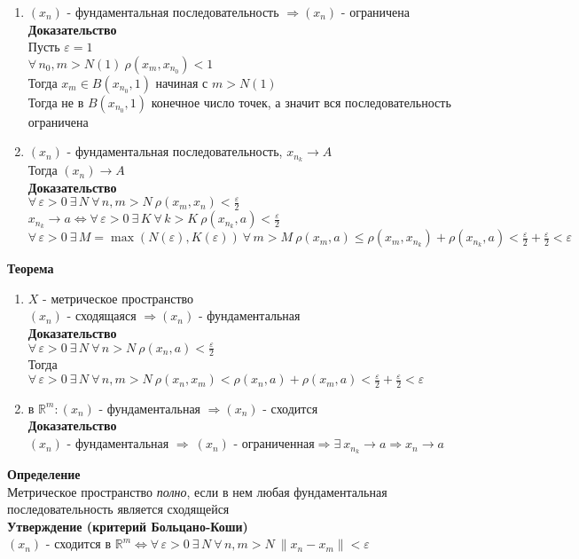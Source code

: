 \documentclass[12pt]{article}
\begin{document}
\begin{enumerate}
    \item $(x_n)$ - фундаментальная последовательность $\Rightarrow (x_n)$ - ограничена\\
    \textbf{Доказательство}\\
    Пусть $\varepsilon = 1$\\
    $\forall\,n_0,m > N(1)\ \rho(x_m,x_{n_0}) < 1$\\
    Тогда $x_m \in B(x_{n_0},1)$ начиная с $m > N(1)$\\
    Тогда не в $B(x_{n_0},1)$ конечное число точек, а значит вся последовательность ограничена
    \item $(x_n)$ - фундаментальная последовательность, $x_{n_k} \rightarrow A$\\
    Тогда $(x_n) \rightarrow A$\\
    \textbf{Доказательство}\\
    $\forall\,\varepsilon>0\ \exists\,N\ \forall\,n,m>N\ \rho(x_m,x_n) < \frac\varepsilon2$\\
    $x_{n_k} \rightarrow a \Leftrightarrow \forall\,\varepsilon>0\ \exists\,K\ \forall\,k>K\ \rho(x_{n_k}, a) <\frac\varepsilon2$\\
    $\forall\,\varepsilon>0\ \exists\,M = \max(N(\varepsilon), K(\varepsilon))\ \forall\,m>M\ \rho(x_m,a) \leq \rho(x_m,x_{n_k})+\rho(x_{n_k}, a) < \frac\varepsilon2+\frac\varepsilon2 < \varepsilon$
\end{enumerate}
\textbf{Теорема}
\begin{enumerate}
    \item $X$ - метрическое пространство\\
     $(x_n)$ - сходящаяся $\Rightarrow (x_n)$ - фундаментальная\\
     \textbf{Доказательство}\\
     $\forall\,\varepsilon>0\ \exists\,N\ \forall\,n>N\ \rho(x_n,a) < \frac\varepsilon2$\\
     Тогда $\forall\,\varepsilon>0\ \exists\,N\ \forall\,n,m>N\ \rho(x_n,x_m)<\rho(x_n,a)+\rho(x_m,a) < \frac\varepsilon2+\frac\varepsilon2 < \varepsilon$
     \item в $\mathbb{R}^m: (x_n)$ - фундаментальная $\Rightarrow (x_n)$ - сходится\\
     \textbf{Доказательство}\\
     $(x_n)$ - фундаментальная $\Rightarrow\ (x_n)$ - ограниченная$ \Rightarrow \exists\ x_{n_k} \rightarrow a \Rightarrow x_n \rightarrow a$
\end{enumerate}
\textbf{Определение}\\
Метрическое пространство \textit{полно}, если в нем любая фундаментальная последовательность является сходящейся\\
\textbf{Утверждение (критерий Больцано-Коши)}\\
$(x_n)$ - сходится в $\mathbb{R}^m \Leftrightarrow \forall\,\varepsilon>0\ \exists\,N\ \forall\,n,m>N\ \|x_n-x_m\| < \varepsilon$
\end{document}
